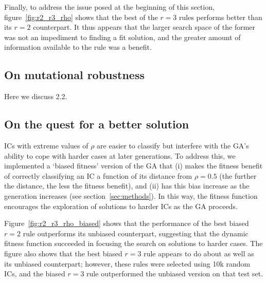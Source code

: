 Finally, to address the issue posed at the beginning of this section, figure~\ref{fig:r2_r3_rho} shows that the best of the $r = 3$ rules performs better than 
its $r = 2$ counterpart. It thus appears that the larger search space of the former was not an impediment to finding a fit solution, and the greater 
amount of information available to the rule was a benefit.

\subsection{On mutational robustness}

Here we discuss 2.2.

\subsection{On the quest for a better solution}

ICs with extreme values of $\rho$ are easier to classify but interfere with the GA's ability to cope with harder cases at later generations. To address this, 
we implemented a `biased fitness' version of the GA that (i) makes the fitness benefit of correctly classifying an IC a function of its distance from 
$\rho = 0.5$ (the further the distance, the less the fitness benefit), and (ii) has this bias increase as the generation increases 
(see section~\ref{sec:methods}). In this way, the fitness function encourages the exploration of solutions to harder ICs as the GA proceeds.

Figure~\ref{fig:r2_r3_rho_biased} shows that the performance of the best biased $r = 2$ rule outperforms its unbiased counterpart, suggesting that 
the dynamic fitness function succeeded in focusing the search on solutions to harder cases. The figure also shows that the best biased $r = 3$ rule 
appears to do about as well as its unbiased counterpart; however, these rules were selected using 10k random ICs, and the biased $r = 3$ rule 
outperformed the unbiased version on that test set.


